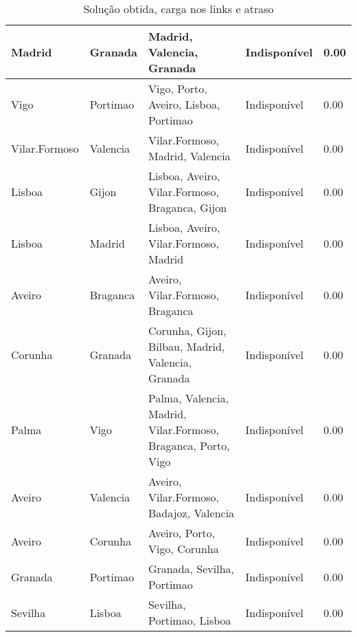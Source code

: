 \begin{table}[!htb]
{\begin{tabular}{|l|l|l|l|l|}
Madrid & Granada & Madrid, Valencia, Granada & Indisponível & 0.00 \\ \hline
Vigo & Portimao & Vigo, Porto, Aveiro, Lisboa, Portimao & Indisponível & 0.00 \\ \hline
Vilar.Formoso & Valencia & Vilar.Formoso, Madrid, Valencia & Indisponível & 0.00 \\ \hline
Lisboa & Gijon & Lisboa, Aveiro, Vilar.Formoso, Braganca, Gijon & Indisponível & 0.00 \\ \hline
Lisboa & Madrid & Lisboa, Aveiro, Vilar.Formoso, Madrid & Indisponível & 0.00 \\ \hline
Aveiro & Braganca & Aveiro, Vilar.Formoso, Braganca & Indisponível & 0.00 \\ \hline
Corunha & Granada & Corunha, Gijon, Bilbau, Madrid, Valencia, Granada & Indisponível & 0.00 \\ \hline
Palma & Vigo & Palma, Valencia, Madrid, Vilar.Formoso, Braganca, Porto, Vigo & Indisponível & 0.00 \\ \hline
Aveiro & Valencia & Aveiro, Vilar.Formoso, Badajoz, Valencia & Indisponível & 0.00 \\ \hline
Aveiro & Corunha & Aveiro, Porto, Vigo, Corunha & Indisponível & 0.00 \\ \hline
Granada & Portimao & Granada, Sevilha, Portimao & Indisponível & 0.00 \\ \hline
Sevilha & Lisboa & Sevilha, Portimao, Lisboa & Indisponível & 0.00 \\ \hline
\end{tabular}}
\caption[]{Solução obtida, carga nos links e atraso}
\end{table}

